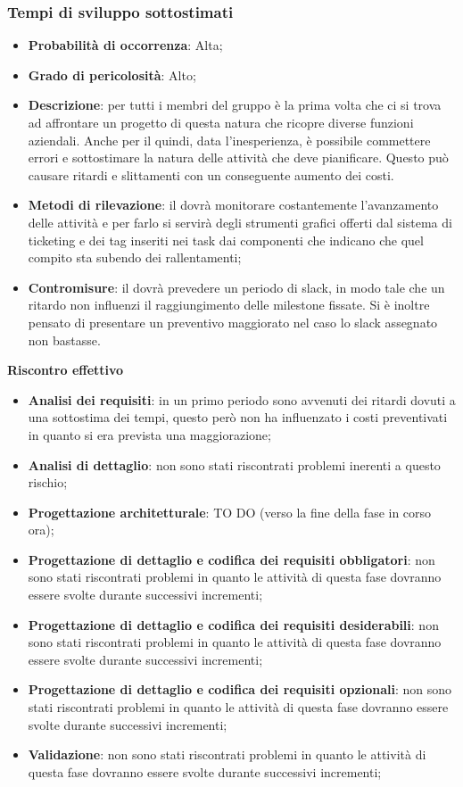 		\subsubsection{Tempi di sviluppo sottostimati} %
		\label{ssub:tempi_di_sviluppo_sottostimati}
			\begin{itemize}
				\item \textbf{Probabilità di occorrenza}: Alta;
				\item \textbf{Grado di pericolosità}: Alto;
				\item \textbf{Descrizione}: per tutti i membri del gruppo è la prima volta che ci si trova ad affrontare un progetto di questa natura che ricopre diverse funzioni aziendali. Anche per il \roleProjectManager{} quindi, data l'inesperienza, è possibile commettere errori e sottostimare la natura delle attività che deve pianificare. Questo può causare ritardi e slittamenti con un conseguente aumento dei costi.
				\item \textbf{Metodi di rilevazione}: il \roleProjectManager{} dovrà monitorare costantemente l'avanzamento delle attività e per farlo si servirà degli strumenti grafici offerti dal sistema di ticketing e dei tag inseriti nei task dai componenti che indicano che quel compito sta subendo dei rallentamenti;
				\item \textbf{Contromisure}: il \roleProjectManager{} dovrà prevedere un periodo di slack, in modo tale che un ritardo non influenzi il raggiungimento delle milestone fissate. Si è inoltre pensato di presentare un preventivo maggiorato nel caso lo slack assegnato non bastasse.
			\end{itemize}
		\noindent
		\textbf{Riscontro effettivo}
			\begin{itemize}
				\item \textbf{Analisi dei requisiti}: in un primo periodo sono avvenuti dei ritardi dovuti a una sottostima dei tempi, questo però non ha influenzato i costi preventivati in quanto si era prevista una maggiorazione;
				\item \textbf{Analisi di dettaglio}: non sono stati riscontrati problemi inerenti a questo rischio;
				\item \textbf{Progettazione architetturale}: TO DO (verso la fine della fase in corso ora);
				\item \textbf{Progettazione di dettaglio e codifica dei requisiti obbligatori}: non sono stati riscontrati problemi in quanto le attività di questa fase dovranno essere svolte durante successivi incrementi;
				\item \textbf{Progettazione di dettaglio e codifica dei requisiti desiderabili}: non sono stati riscontrati problemi in quanto le attività di questa fase dovranno essere svolte durante successivi incrementi;
				\item \textbf{Progettazione di dettaglio e codifica dei requisiti opzionali}: non sono stati riscontrati problemi in quanto le attività di questa fase dovranno essere svolte durante successivi incrementi;
				\item \textbf{Validazione}: non sono stati riscontrati problemi in quanto le attività di questa fase dovranno essere svolte durante successivi incrementi;
			\end{itemize}


